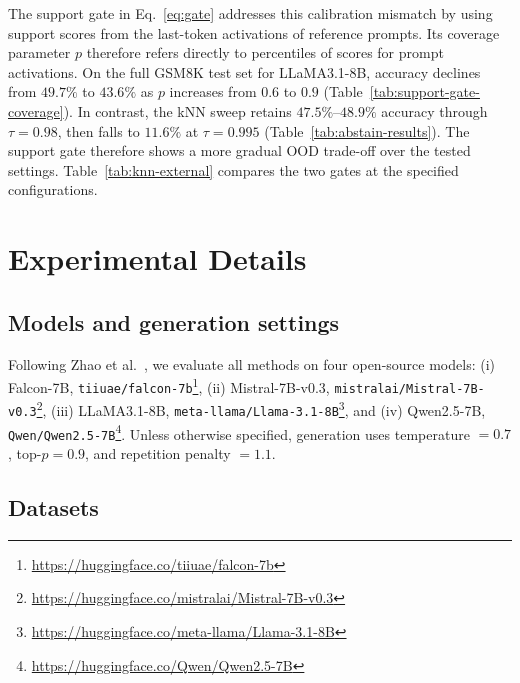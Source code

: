 The support gate in Eq.~\eqref{eq:gate} addresses this calibration mismatch by using support scores from the last-token activations of reference prompts. Its coverage parameter $p$ therefore refers directly to percentiles of scores for prompt activations. On the full GSM8K test set for LLaMA3.1-8B, accuracy declines from $49.7\%$ to $43.6\%$ as $p$ increases from $0.6$ to $0.9$ (Table~\ref{tab:support-gate-coverage}). In contrast, the kNN sweep retains $47.5\%$--$48.9\%$ accuracy through $\tau=0.98$, then falls to $11.6\%$ at $\tau=0.995$ (Table~\ref{tab:abstain-results}). The support gate therefore shows a more gradual OOD trade-off over the tested settings. Table~\ref{tab:knn-external} compares the two gates at the specified configurations.

\section{Experimental Details}
\label{appendix:experimental_details}

\subsection{Models and generation settings}

Following Zhao et al.~\cite{zhaoodesteer}, we evaluate all methods on four open-source models: (i) Falcon-7B, \texttt{tiiuae/falcon-7b}\footnote{\url{https://huggingface.co/tiiuae/falcon-7b}}, (ii) Mistral-7B-v0.3, \texttt{mistralai/Mistral-7B-v0.3}\footnote{\url{https://huggingface.co/mistralai/Mistral-7B-v0.3}}, (iii) LLaMA3.1-8B, \texttt{meta-llama/Llama-3.1-8B}\footnote{\url{https://huggingface.co/meta-llama/Llama-3.1-8B}}, and (iv) Qwen2.5-7B, \texttt{Qwen/Qwen2.5-7B}\footnote{\url{https://huggingface.co/Qwen/Qwen2.5-7B}}. Unless otherwise specified, generation uses temperature $=0.7$, top-$p=0.9$, and repetition penalty $=1.1$.


\subsection{Datasets}


